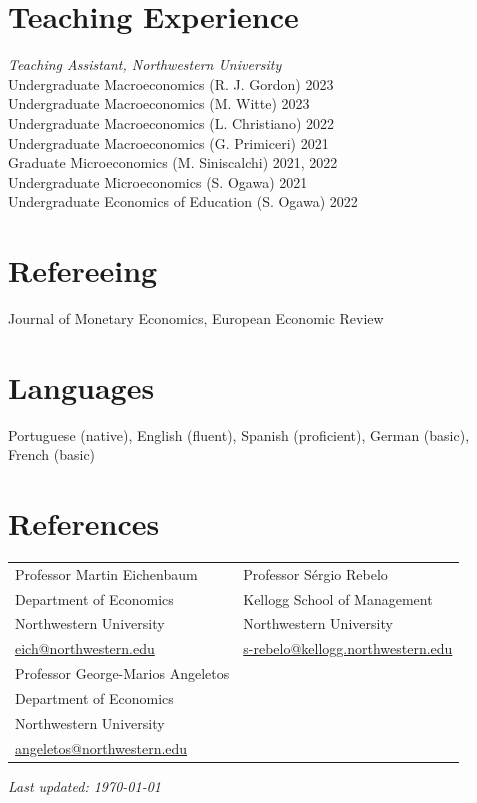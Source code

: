 \documentclass[11pt]{article}
\begin{document}
\section{Teaching Experience}
\noindent
\textit{Teaching Assistant, Northwestern University} \\[2pt]
Undergraduate Macroeconomics (R. J. Gordon) \hfill 2023 \\
Undergraduate Macroeconomics (M. Witte) \hfill 2023 \\
Undergraduate Macroeconomics (L. Christiano) \hfill 2022 \\
Undergraduate Macroeconomics (G. Primiceri) \hfill 2021 \\
Graduate Microeconomics (M. Siniscalchi) \hfill 2021, 2022 \\
Undergraduate Microeconomics (S. Ogawa) \hfill 2021 \\
Undergraduate Economics of Education (S. Ogawa) \hfill 2022

\section{Refereeing}
\noindent
Journal of Monetary Economics, European Economic Review

\section{Languages}
Portuguese (native), English (fluent), Spanish (proficient), German (basic), French (basic)

\section{References}
\noindent\begin{tabularx}{\textwidth}{@{}XX@{}}
Professor Martin Eichenbaum & Professor Sérgio Rebelo \\
Department of Economics     & Kellogg School of Management \\
Northwestern University      & Northwestern University \\
\href{mailto:eich@northwestern.edu}{eich@northwestern.edu} & \href{mailto:s-rebelo@kellogg.northwestern.edu}{s-rebelo@kellogg.northwestern.edu} \\[8pt]
Professor George-Marios Angeletos & \\
Department of Economics     & \\
Northwestern University      & \\
\href{mailto:angeletos@northwestern.edu}{angeletos@northwestern.edu} & \\
\end{tabularx}

\vfill
\hfill {\small\itshape Last updated: \today}
\end{document}

